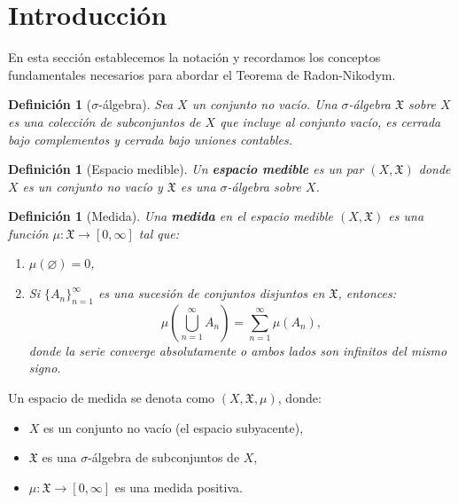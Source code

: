 \documentclass[12pt,a4paper]{article}
\theoremstyle{profesional}
\theoremstyle{definicion-style}
\newtheorem{definicion}[teorema]{Definición}
\newcommand{\X}{\mathfrak{X}}
\begin{document}
\vspace*{\fill}

\newpage

\tableofcontents
\thispagestyle{empty}
\newpage

\section{Introducción}

En esta sección establecemos la notación y recordamos los conceptos fundamentales necesarios para abordar el Teorema de Radon-Nikodym.

\begin{definicion}[\( \sigma \)-álgebra]
    Sea \(X\) un conjunto no vacío. Una \(\sigma \)-álgebra \(\X \) sobre \(X\) es una colección de subconjuntos de \(X\) que incluye al conjunto vacío, es cerrada bajo complementos y cerrada bajo uniones contables.
\end{definicion}

\begin{definicion}[Espacio medible]
    Un \textbf{espacio medible} es un par \((X, \X)\) donde \(X\) es un conjunto no vacío y \(\X \) es una \( \sigma \)-álgebra sobre \(X\).
\end{definicion}

\begin{definicion}[Medida]
    Una \textbf{medida} en el espacio medible \((X, \X)\) es una función \(\mu: \X \to [0, \infty]\) tal que:
    \begin{enumerate}[label = (\roman*)]
        \item \(\mu(\varnothing) = 0\),
        \item Si \({\{ A_n \}}_{n=1}^{\infty}\) es una sucesión de conjuntos disjuntos en \(\X \), entonces:
              \[\mu\left(\bigcup_{n=1}^{\infty} A_n\right) = \sum_{n=1}^{\infty} \mu(A_n),\]
              donde la serie converge absolutamente o ambos lados son infinitos del mismo signo.
    \end{enumerate}
\end{definicion}

Un espacio de medida se denota como \( (X, \X, \mu) \), donde:
\begin{itemize}[leftmargin=2em]
    \item \(X\) es un conjunto no vacío (el espacio subyacente),
    \item \(\X \) es una \(\sigma \)-álgebra de subconjuntos de \(X\),
    \item \(\mu: \X \to [0, \infty]\) es una medida positiva.
\end{itemize}
\end{document}
